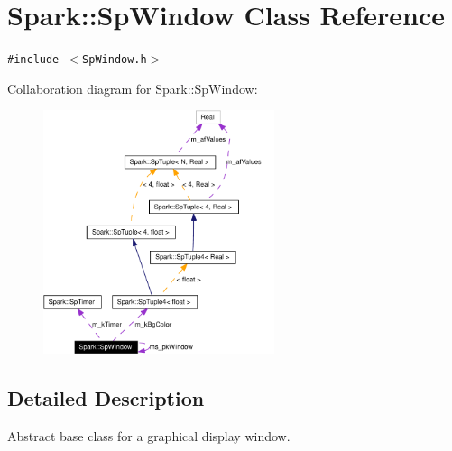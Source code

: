 \section{Spark::Sp\-Window Class Reference}
\label{classSpark_1_1SpWindow}
{\tt \#include $<$Sp\-Window.h$>$}

Collaboration diagram for Spark::Sp\-Window:\begin{figure}[H]
\begin{center}
\leavevmode
\includegraphics[width=192pt]{classSpark_1_1SpWindow__coll__graph}
\end{center}
\end{figure}


\subsection{Detailed Description}
Abstract base class for a graphical display window. 

